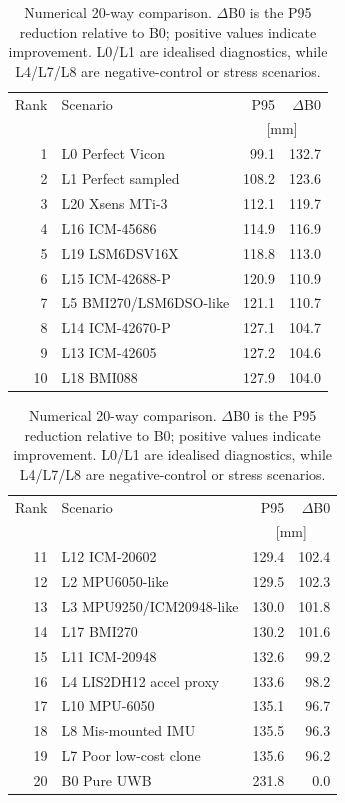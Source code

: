 \documentclass[10pt,a4paper]{article}
\begin{document}
\begin{table}[H]
\centering
\caption{Numerical 20-way comparison. $\Delta$B0 is the P95 reduction relative to B0; positive values indicate improvement. L0/L1 are idealised diagnostics, while L4/L7/L8 are negative-control or stress scenarios.}
\label{tab:twenty}
\scriptsize
\begin{minipage}[t]{0.49\textwidth}
\centering
\begin{tabular}{@{}r l r r@{}}
\toprule
Rank & Scenario & P95 & $\Delta$B0 \\
& & \multicolumn{2}{c}{[mm]} \\
\midrule
1  & L0 Perfect Vicon & 99.1 & 132.7 \\
2  & L1 Perfect sampled & 108.2 & 123.6 \\
3  & L20 Xsens MTi-3 & 112.1 & 119.7 \\
4  & L16 ICM-45686 & 114.9 & 116.9 \\
5  & L19 LSM6DSV16X & 118.8 & 113.0 \\
6  & L15 ICM-42688-P & 120.9 & 110.9 \\
7  & L5 BMI270/LSM6DSO-like & 121.1 & 110.7 \\
8  & L14 ICM-42670-P & 127.1 & 104.7 \\
9  & L13 ICM-42605 & 127.2 & 104.6 \\
10 & L18 BMI088 & 127.9 & 104.0 \\
\bottomrule
\end{tabular}
\end{minipage}\hfill
\begin{minipage}[t]{0.49\textwidth}
\centering
\begin{tabular}{@{}r l r r@{}}
\toprule
Rank & Scenario & P95 & $\Delta$B0 \\
& & \multicolumn{2}{c}{[mm]} \\
\midrule
11 & L12 ICM-20602 & 129.4 & 102.4 \\
12 & L2 MPU6050-like & 129.5 & 102.3 \\
13 & L3 MPU9250/ICM20948-like & 130.0 & 101.8 \\
14 & L17 BMI270 & 130.2 & 101.6 \\
15 & L11 ICM-20948 & 132.6 & 99.2 \\
16 & L4 LIS2DH12 accel proxy & 133.6 & 98.2 \\
17 & L10 MPU-6050 & 135.1 & 96.7 \\
18 & L8 Mis-mounted IMU & 135.5 & 96.3 \\
19 & L7 Poor low-cost clone & 135.6 & 96.2 \\
20 & B0 Pure UWB & 231.8 & 0.0 \\
\bottomrule
\end{tabular}
\end{minipage}
\end{table}
\end{document}
